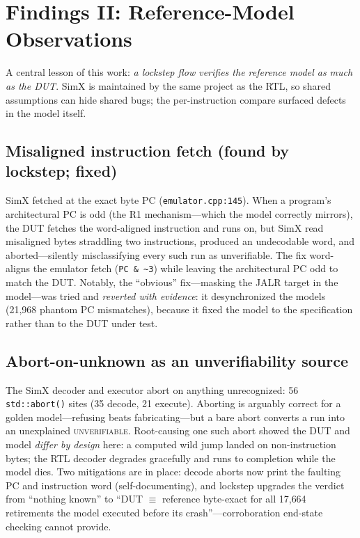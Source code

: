 \documentclass[conference]{IEEEtran}
\newcommand{\code}[1]{\texttt{\small #1}}
\begin{document}
\section{Findings II: Reference-Model Observations}
\label{sec:reffindings}

A central lesson of this work: \emph{a lockstep flow verifies the
reference model as much as the DUT}. SimX is maintained by the same
project as the RTL, so shared assumptions can hide shared bugs; the
per-instruction compare surfaced defects in the model itself.

\subsection{Misaligned instruction fetch (found by lockstep; fixed)}
SimX fetched at the exact byte PC
(\code{emulator.cpp:145}). When a program's architectural PC is odd
(the R1 mechanism---which the model correctly mirrors), the DUT
fetches the word-aligned instruction and runs on, but SimX read
misaligned bytes straddling two instructions, produced an undecodable
word, and aborted---silently misclassifying every such run as
unverifiable. The fix word-aligns the emulator fetch
(\code{PC \& \~{}3}) while leaving the architectural PC odd to match
the DUT. Notably, the ``obvious'' fix---masking the JALR target in the
model---was tried and \emph{reverted with evidence}: it desynchronized
the models (21{,}968 phantom PC mismatches), because it fixed the
model to the specification rather than to the DUT under test.

\subsection{Abort-on-unknown as an unverifiability source}
The SimX decoder and executor abort on anything unrecognized:
56 \code{std::abort()} sites (35 decode, 21 execute). Aborting is
arguably correct for a golden model---refusing beats fabricating---but
a bare abort converts a run into an unexplained \textsc{unverifiable}.
Root-causing one such abort showed the DUT and model \emph{differ by
design} here: a computed wild jump landed on non-instruction bytes; the
RTL decoder degrades gracefully and runs to completion while the model
dies. Two mitigations are in place: decode aborts now print the
faulting PC and instruction word (self-documenting), and lockstep
upgrades the verdict from ``nothing known'' to ``DUT $\equiv$ reference
byte-exact for all 17{,}664 retirements the model executed before its
crash''---corroboration end-state checking cannot provide.
\end{document}
